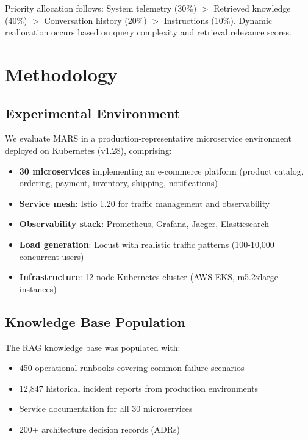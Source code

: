 \documentclass[journal]{IEEEtran}
\begin{document}
Priority allocation follows: System telemetry (30\%) $>$ Retrieved knowledge (40\%) $>$ Conversation history (20\%) $>$ Instructions (10\%). Dynamic reallocation occurs based on query complexity and retrieval relevance scores.

\section{Methodology}
\label{sec:methodology}

\subsection{Experimental Environment}

We evaluate MARS in a production-representative microservice environment deployed on Kubernetes (v1.28), comprising:
\begin{itemize}
    \item \textbf{30 microservices} implementing an e-commerce platform (product catalog, ordering, payment, inventory, shipping, notifications)
    \item \textbf{Service mesh}: Istio 1.20 for traffic management and observability
    \item \textbf{Observability stack}: Prometheus, Grafana, Jaeger, Elasticsearch
    \item \textbf{Load generation}: Locust with realistic traffic patterns (100-10,000 concurrent users)
    \item \textbf{Infrastructure}: 12-node Kubernetes cluster (AWS EKS, m5.2xlarge instances)
\end{itemize}

\subsection{Knowledge Base Population}

The RAG knowledge base was populated with:
\begin{itemize}
    \item 450 operational runbooks covering common failure scenarios
    \item 12,847 historical incident reports from production environments
    \item Service documentation for all 30 microservices
    \item 200+ architecture decision records (ADRs)
\end{itemize}
\end{document}
